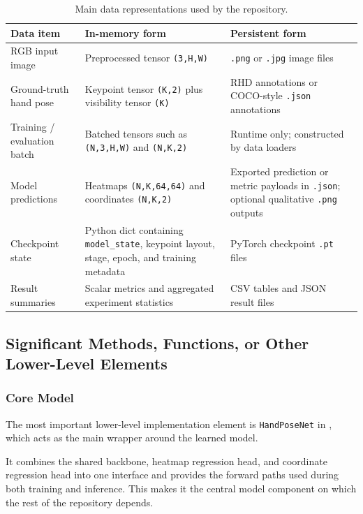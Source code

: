﻿\documentclass[11pt,a4paper]{article}
\begin{document}
\begin{table}[htbp]
\centering
\small
\begin{tabular}{|p{}|p{}|p{}|}
\hline
\textbf{Data item} & \textbf{In-memory form} & \textbf{Persistent form} \\
\hline
RGB input image & Preprocessed tensor \texttt{(3,H,W)} & \texttt{.png} or \texttt{.jpg} image files \\
\hline
Ground-truth hand pose & Keypoint tensor \texttt{(K,2)} plus visibility tensor \texttt{(K)} & RHD annotations or COCO-style \texttt{.json} annotations \\
\hline
Training / evaluation batch & Batched tensors such as \texttt{(N,3,H,W)} and \texttt{(N,K,2)} & Runtime only; constructed by data loaders \\
\hline
Model predictions & Heatmaps \texttt{(N,K,64,64)} and coordinates \texttt{(N,K,2)} & Exported prediction or metric payloads in \texttt{.json}; optional qualitative \texttt{.png} outputs \\
\hline
Checkpoint state & Python dict containing \texttt{model\_state}, keypoint layout, stage, epoch, and training metadata & PyTorch checkpoint \texttt{.pt} files \\
\hline
Result summaries & Scalar metrics and aggregated experiment statistics & CSV tables and JSON result files \\
\hline
\end{tabular}
\caption{Main data representations used by the repository.}
\label{tab:data-representations}
\end{table}

\subsection{Significant Methods, Functions, or Other Lower-Level Elements}

\subsubsection*{Core Model}

The most important lower-level implementation element is \texttt{HandPoseNet}
in , which acts as the main
wrapper around the learned model.

\medskip

It combines the shared backbone, heatmap regression head, and coordinate
regression head into one interface and provides the forward paths used during
both training and inference. This makes it the central model component on
which the rest of the repository depends.
\end{document}
